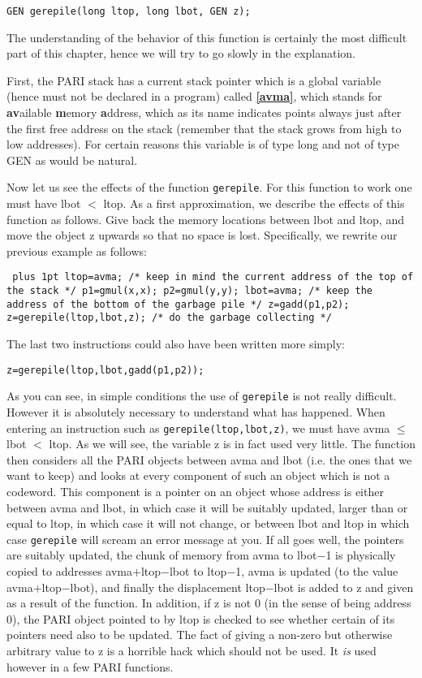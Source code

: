 {\tt GEN gerepile(long ltop, long lbot, GEN z);}

The understanding of the behavior of this function is certainly the most
difficult part of this chapter, hence we will try to go slowly in the
explanation.

First, the PARI stack has a current stack pointer which is a global variable
(hence must not be declared in a program) called {\bf \ref{avma}},
which stands for {\bf av}ailable {\bf m}emory {\bf a}ddress, which as
its name indicates points always just after the first free address on
the stack (remember that the stack grows from high to low addresses).
For certain reasons this variable is of type long and not of type GEN as
would be natural.

Now let us see the effects of the function {\tt gerepile}.
For this function to work one must have lbot $<$ ltop. As a first 
approximation, we describe the effects of this function as follows.
Give back the memory locations between lbot and ltop, and move the object z
upwards so that no space is lost. Specifically, we rewrite our previous
example as follows:

{\tt \obeylines\parskip=0pt plus 1pt
\hbox{}
ltop=avma; /* keep in mind the current address of the top of the stack */
p1=gmul(x,x); p2=gmul(y,y);
lbot=avma; /* keep the address of the bottom of the garbage pile */
z=gadd(p1,p2);
z=gerepile(ltop,lbot,z); /* do the garbage collecting */}

The last two instructions could also have been written more simply:

{\tt z=gerepile(ltop,lbot,gadd(p1,p2));}

As you can see, in simple conditions the use of {\tt gerepile} is not really
difficult. However it is absolutely necessary to understand what has
happened. When entering an instruction such as {\tt gerepile(ltop,lbot,z)},
we must have avma $\le$ lbot $<$ ltop. As we will see, the variable z is in fact
used very little. The function then considers all the PARI objects between
avma and lbot (i.e. the ones that we want to keep) and looks at every
component of such an object which is not a codeword. This component is a
pointer on an object whose address is either between avma and lbot, in which
case it will be suitably updated, larger than or equal to ltop, in which case
it will not change, or between lbot and ltop in which case {\tt gerepile} will
scream an error message at you. If all goes well, the pointers are suitably
updated, the chunk of memory from avma to lbot$-$1 is physically copied to
addresses avma$+$ltop$-$lbot to ltop$-$1, avma is updated (to the value
avma$+$ltop$-$lbot), and finally the displacement ltop$-$lbot is added to z and
given as a result of the function. In addition, if z is not 0 (in the sense
of being address 0), the PARI object pointed to by ltop is checked to see
whether certain of its pointers need also to be updated. The fact of 
giving a non-zero but otherwise arbitrary value to z is a horrible hack
which should not be used. It {\it is\/} used however in a few PARI
functions.


